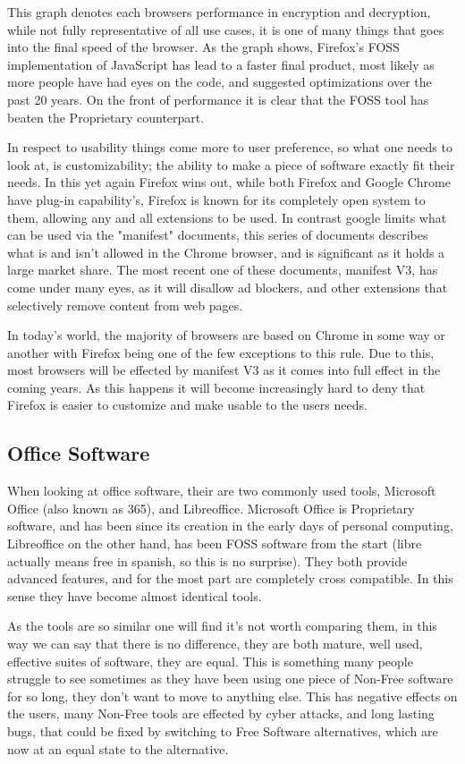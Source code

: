 \documentclass[a4paper,12pt]{article}
\begin{document}
{This graph denotes each browsers performance in encryption and decryption, while not fully representative of all
use cases, it is one of many things that goes into the final speed of the browser. As the graph shows, Firefox's
FOSS implementation of JavaScript has lead to a faster final product, most likely as more people have had eyes
on the code, and suggested optimizations over the past 20 years. On the front of performance it is clear that the
FOSS tool has beaten the Proprietary counterpart.

In respect to usability things come more to user preference, so what one needs to look at, is customizability;
the ability to make a piece of software exactly fit their needs. In this yet again Firefox wins out, while both
Firefox and Google Chrome have plug-in capability's, Firefox is known for its completely open system to them,
allowing any and all extensions to be used. In contrast google limits what can be used via the "manifest" documents,
this series of documents describes what is and isn't allowed in the Chrome browser, and is significant as it holds
a large market share. The most recent one of these documents, manifest V3\cite{MANIFESTv3}, has come under many
eyes, as it will disallow ad blockers, and other extensions that selectively remove content from web pages.

In today's world, the majority of browsers are based on Chrome in some way or another with Firefox being one of
the few exceptions to this rule. Due to this, most browsers will be effected by manifest V3 as it comes into full
effect in the coming years.  As this happens it will become increasingly hard to deny that Firefox is easier to
customize and make usable to the users needs.

\subsection{Office Software} When looking at office software, their are two commonly used tools, Microsoft Office
(also known as 365), and Libreoffice.  Microsoft Office is Proprietary software, and has been since its creation
in the early days of personal computing, Libreoffice on the other hand, has been FOSS software from the start
(libre actually means free in spanish, so this is no surprise).  They both provide advanced features, and for the
most part are completely cross compatible. In this sense they have become almost identical tools.

As the tools are so similar one will find it's not worth comparing them, in this way we can say that there is no
difference, they are both mature, well used, effective suites of software, they are equal. This is something many
people struggle to see sometimes as they have been using one piece of Non-Free software for so long, they don't
want to move to anything else.	This has negative effects on the users, many Non-Free tools are effected by cyber
attacks, and long lasting bugs, that could be fixed by switching to Free Software alternatives, which are now at
an equal state to the alternative.

}
\end{document}
